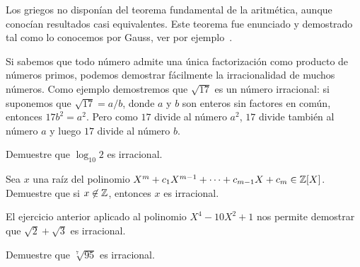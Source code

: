 Los griegos no disponían del teorema fundamental de la aritmética, aunque conocían resultados casi equivalentes. Este teorema
fue enunciado y demostrado tal como lo conocemos por Gauss, ver por ejemplo~\cite{MR1277244,MR1849798,MR1163928,MR497463}. 

Si sabemos que todo número admite una única
factorización como producto de números primos, podemos demostrar fácilmente la
irracionalidad de muchos números. Como ejemplo demostremos que $\sqrt{17}$ es
un número irracional: si suponemos que $\sqrt{17}=a/b$, donde $a$ y $b$ son
enteros sin factores en común, entonces $17b^2=a^2$. Pero como $17$ divide al
número $a^2$, $17$ divide también al número $a$ y luego $17$ divide al número
$b$.

\begin{exercise}
	Demuestre que $\log_{10}2$ es irracional.
\end{exercise}

\begin{exercise}
	Sea $x$ una raíz del polinomio $X^m+c_1X^{m-1}+\cdots+c_{m-1}X+c_m\in\mathbb{Z}[X]$. 
	Demuestre que si $x\not\in\mathbb{Z}$, entonces $x$ es irracional. 
\end{exercise}


El ejercicio anterior aplicado al polinomio $X^4-10X^2+1$ 
nos permite demostrar que $\sqrt{2}+\sqrt{3}$ es irracional. 

\begin{exercise}
	Demuestre que $\sqrt[7]{95}$ es irracional.
\end{exercise}


